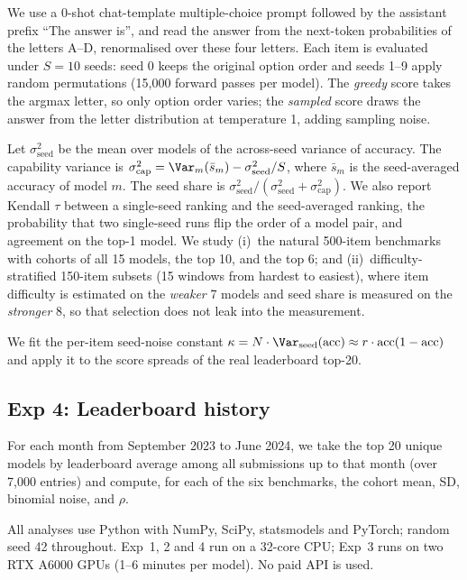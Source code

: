  We use a 0-shot chat-template multiple-choice prompt followed by the assistant prefix ``The answer is'', and read the answer from the next-token probabilities of the letters A--D, renormalised over these four letters. Each item is evaluated under $S = 10$ seeds: seed 0 keeps the original option order and seeds 1--9 apply random permutations (15{,}000 forward passes per model). The {\em greedy} score takes the argmax letter, so only option order varies; the {\em sampled} score draws the answer from the letter distribution at temperature 1, adding sampling noise.

 Let $\sigma^2_{\text{seed}}$ be the mean over models of the across-seed variance of accuracy. The capability variance is $\sigma^2_{\text{cap}} = \Var_m(\bar{s}_m) - \sigma^2_{\text{seed}}/S$, where $\bar{s}_m$ is the seed-averaged accuracy of model $m$. The seed share is $\sigma^2_{\text{seed}} / (\sigma^2_{\text{seed}} + \sigma^2_{\text{cap}})$. We also report Kendall $\tau$ between a single-seed ranking and the seed-averaged ranking, the probability that two single-seed runs flip the order of a model pair, and agreement on the top-1 model. We study (i)~the natural 500-item benchmarks with cohorts of all 15 models, the top 10, and the top 6; and (ii)~difficulty-stratified 150-item subsets (15 windows from hardest to easiest), where item difficulty is estimated on the {\em weaker} 7 models and seed share is measured on the {\em stronger} 8, so that selection does not leak into the measurement.

 We fit the per-item seed-noise constant $\kappa = \Nitems \cdot \Var_{\text{seed}}(\text{acc}) \approx r \cdot \text{acc}(1-\text{acc})$ and apply it to the score spreads of the real leaderboard top-20.

\subsection{Exp 4: Leaderboard history}
\label{sec:exp4}

For each month from September 2023 to June 2024, we take the top 20 unique models by leaderboard average among all submissions up to that month (over 7{,}000 entries) and compute, for each of the six benchmarks, the cohort mean, SD, binomial noise, and $\rho$.

 All analyses use Python with NumPy, SciPy, statsmodels and PyTorch; random seed 42 throughout. Exp~1, 2 and 4 run on a 32-core CPU; Exp~3 runs on two RTX A6000 GPUs (1--6 minutes per model). No paid API is used.
